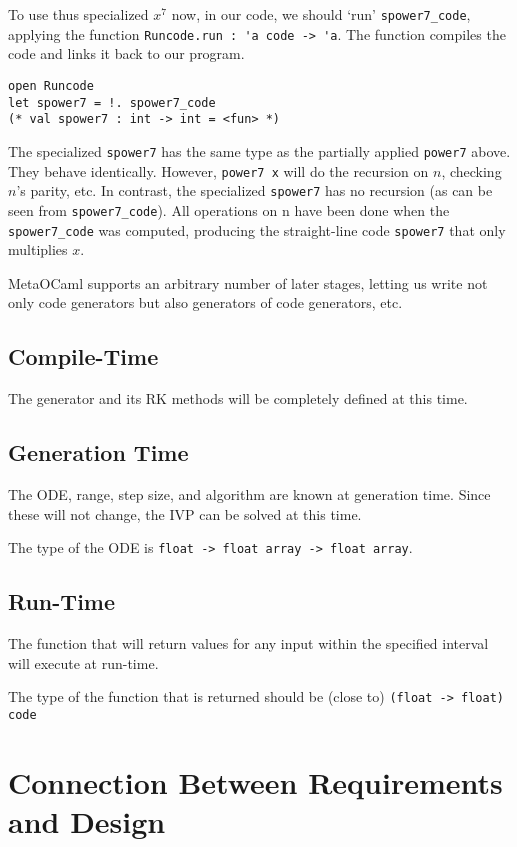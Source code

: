 \documentclass[12pt, titlepage]{article}
\begin{document}
To use thus specialized $x^7$ now, in our code, we should `run' 
\lstinline|spower7_code|, 
applying the function \lstinline|Runcode.run : 'a code -> 'a|. The function 
compiles the 
code and links it back to our program. 

\begin{lstlisting}
open Runcode
let spower7 = !. spower7_code
(* val spower7 : int -> int = <fun> *)
\end{lstlisting}

The specialized \lstinline|spower7| has the same type as the partially applied 
\lstinline|power7| above. They behave identically. However, 
\lstinline|power7 x| will do the recursion on $n$, checking $n$'s parity, etc. 
In contrast, the specialized \lstinline|spower7| has no recursion (as can be 
seen from \lstinline|spower7_code|). All operations on n have been done when 
the \lstinline|spower7_code| was computed, producing the straight-line code 
\lstinline|spower7| that only multiplies $x$.

MetaOCaml supports an arbitrary number of later stages, letting us write not 
only code generators but also generators of code generators, etc.

\subsection{Compile-Time}
The generator and its RK methods will be completely defined at this time.

\subsection{Generation Time}
The ODE, range, step size, and algorithm are known at generation time. Since 
these will not change, the IVP can be solved at this time.

The type of the ODE is \lstinline|float -> float array -> float array|.

\subsection{Run-Time}
The function that will return values for any input within the specified 
interval will execute at run-time.

The type of the function that is returned should be (close to) 
\lstinline|(float -> float) code|

\section{Connection Between Requirements and Design} \label{SecConnection}
\end{document}

